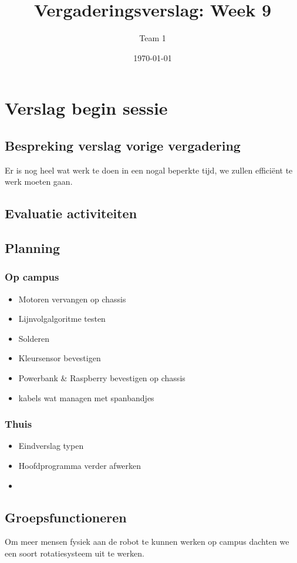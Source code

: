 \documentclass[a4paper,kulak]{kulakarticle} %
\date{\today}
\title{Vergaderingsverslag: Week 9}
\author{Team 1}
\begin{document}
\maketitle

\section{Verslag begin sessie}
\subsection{Bespreking verslag vorige vergadering}
Er is nog heel wat werk te doen in een nogal beperkte tijd, we zullen efficiënt te werk moeten gaan. 
\subsection{Evaluatie activiteiten}

\subsection{Planning}
\subsubsection*{Op campus}
\begin{itemize}
	\item Motoren vervangen op chassis
	\item Lijnvolgalgoritme testen
	\item Solderen
	\item Kleursensor bevestigen
	\item Powerbank \& Raspberry bevestigen op chassis
	\item kabels wat managen met spanbandjes
\end{itemize}

\subsubsection*{Thuis}
\begin{itemize}
	\item Eindverslag typen
	\item Hoofdprogramma verder afwerken
	\item 
\end{itemize}
\subsection{Groepsfunctioneren}
Om meer mensen fysiek aan de robot te kunnen werken op campus dachten we een soort rotatiesysteem uit te werken. 
\end{document}
